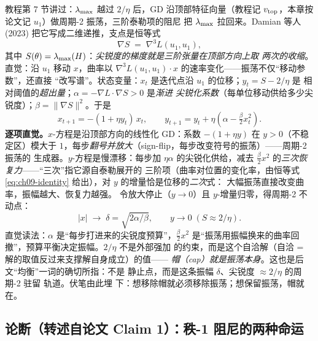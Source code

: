 教程第 7 节讲过：$\lambda_{\max}$ 越过 $2/\eta$ 后，GD 沿顶部特征向量（教程记
$v_{\mathrm{top}}$，本章按论文记 $u_1$）做周期-2 振荡，三阶泰勒项的阻尼
把 $\lambda_{\max}$ 拉回来。Damian 等人 (2023) 把它写成二维递推，支点是恒等式
\begin{equation}
  \nabla S \;=\; \nabla^{3}L(u_1,u_1),
  \label{eq:ch09-identity}
\end{equation}
其中 $S(\theta)=\lambda_{\max}(H)$：\emph{尖锐度的梯度就是三阶张量在顶部方向上取
两次的收缩}。直觉：沿 $u_1$ 移动 $x$，曲率以
$\nabla^{3}L(u_1,u_1)\cdot x$ 的速率变化——振荡不仅“移动参数”，还直接
“改写谱”。状态变量：$x_t$ 是迭代点沿 $u_1$ 的位移；$y_t=S-2/\eta$ 是
相对阈值的\emph{超出量}；$\alpha=-\nabla L\cdot\nabla S>0$ 是\emph{渐进
尖锐化系数}（每单位移动供给多少尖锐度）；$\beta=\|\nabla S\|^2$。于是
\begin{equation}
  x_{t+1}=-(1+\eta y_t)\,x_t,
  \qquad
  y_{t+1}=y_t+\eta\!\left(\alpha-\tfrac{\beta}{2}x_t^{2}\right).
  \label{eq:ch09-damian}
\end{equation}
\textbf{逐项直觉。}$x$-方程是沿顶部方向的线性化 GD：系数 $-(1+\eta y)$
在 $y>0$（不稳定区）模大于 $1$，每步\emph{翻号并放大}（sign-flip，每步改变符号的振荡）——周期-2 振荡的
生成器。$y$-方程是慢漂移：每步加 $\eta\alpha$ 的尖锐化供给，减去
$\tfrac{\beta}{2}x^2$ 的\emph{三次恢复力}——“三次”指它源自泰勒展开的
三阶项（曲率对位置的变化率，由恒等式
\eqref{eq:ch09-identity} 给出），对 $y$ 的增量恰是位移的\emph{二次}式：
大幅振荡直接改变曲率，振幅越大、恢复力越强。
令放大停止（$y\to0$）且 $y$-增量归零，得周期-2 不动点：
\begin{equation}
  |x|\;\to\;\delta=\sqrt{2\alpha/\beta},
  \qquad
  y\to0\;(S\approx2/\eta).
  \label{eq:ch09-fixedpoint}
\end{equation}
直觉读法：$\alpha$ 是“每步打进来的尖锐度预算”，$\tfrac{\beta}{2}x^2$
是“振荡用振幅换来的曲率回撤”，预算平衡决定振幅。$2/\eta$ 不是外部强加
的约束，而是这个自洽解（自洽 = 解的取值反过来支撑解自身成立）的值——
\emph{帽（cap）就是振荡本身}。这也是后文“均衡”一词的确切所指：不是
静止点，而是这条振幅 $\delta$、尖锐度 $\approx2/\eta$ 的周期-2 驻留
轨道。伏笔由此埋
下：想移除帽就必须移除振荡；想保留振荡，帽就在。

\subsection{论断（转述自论文 Claim 1）：秩-1 阻尼的两种命运}\label{sec:ch09-claim}


